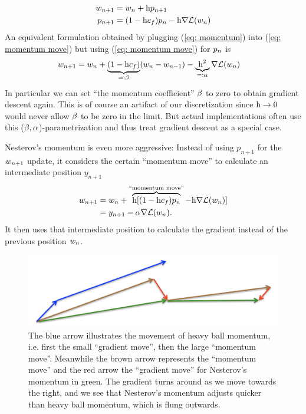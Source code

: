 \begin{definition}
	\begin{subequations}
	\begin{align}
		w_{n+1} &= w_n + \text{h} p_{n+1} \label{eq: momentum move}\\
		p_{n+1} &= (1-\text{h}c_f)p_n - \text{h}\nabla \mathcal{L}(w_n)
		\label{eq: momentum}
	\end{align}
	\end{subequations}
	An equivalent formulation obtained by plugging (\ref{eq: momentum}) into
	(\ref{eq: momentum move}) but using (\ref{eq: momentum move}) for
	\(p_n\) is
	\begin{align}\label{eq: flat momentum}
		w_{n+1}
		&= w_n
		+ \underbrace{(1-\text{h}c_f)}_{
			=:\beta
		}(w_n - w_{n-1})
		- \underbrace{\text{h}^2}_{=:\alpha}\nabla \mathcal{L}(w_n)
	\end{align}
	In particular we can set ``the momentum coefficient'' \(\beta\) to zero to
	obtain gradient descent again. This is of course an artifact of our
	discretization since \(\text{h}\to0\) would never allow \(\beta\) to be zero
	in the limit. But actual implementations often use this
	(\(\beta,\alpha\))-parametrization and thus treat gradient descent as a
	special case.
\end{definition}
%
Nesterov's momentum is even more aggressive: Instead of using \(p_{n+1}\) for
the \(w_{n+1}\) update, it considers the certain ``momentum move''
to calculate an intermediate position \(y_{n+1}\)
%
\begin{align*}
	w_{n+1}
	&= w_n + \overbrace{\text{h} [(1-\text{h}c_f)p_n}^{\text{``momentum move''}}
	- \text{h}\nabla \mathcal{L}(w_n)] \\
	&= y_{n+1} - \alpha \nabla \mathcal{L}(w_n).
\end{align*}
%
It then uses that intermediate position to calculate the gradient instead of the
previous position \(w_n\).
%
\begin{figure}[h]
	\centering
	\includegraphics[scale=0.5]{media/hinton_nesterov_momentum.png}
	\caption{
		\parencite[lecture 6c]{hintonNeuralNetworksMachine2012} The blue arrow
		illustrates the movement of heavy ball momentum, i.e. first the small
		``gradient move'', then the large ``momentum move''. Meanwhile the brown
		arrow represents the ``momentum move'' and the red arrow the ``gradient
		move'' for Nesterov's momentum in green. The gradient turns around as we
		move towards the right, and we see that Nesterov's momentum adjusts
		quicker than heavy ball momentum, which is flung outwards.
	}
\end{figure}
